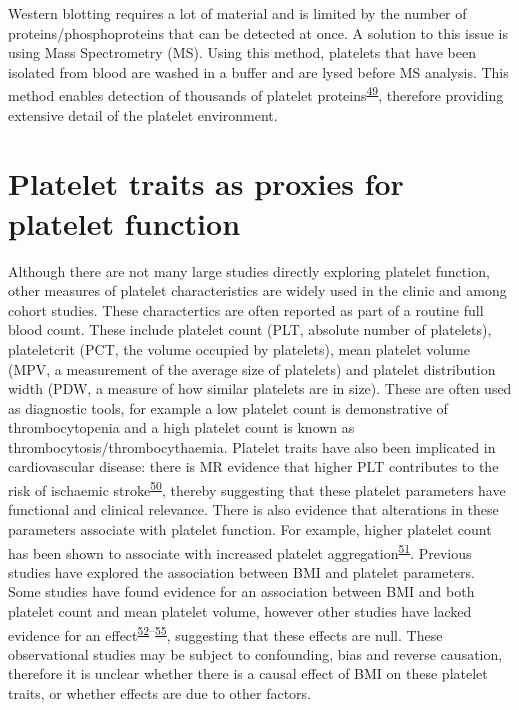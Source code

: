 \documentclass[11pt,twoside]{bristolthesis}
\begin{document}
Western blotting requires a lot of material and is limited by the number of proteins/phosphoproteins that can be detected at once. A solution to this issue is using Mass Spectrometry (MS). Using this method, platelets that have been isolated from blood are washed in a buffer and are lysed before MS analysis. This method enables detection of thousands of platelet proteins\textsuperscript{\protect\hyperlink{ref-Huang2021}{49}}, therefore providing extensive detail of the platelet environment.

\hypertarget{platelet-traits-as-proxies-for-platelet-function}{%
\section{Platelet traits as proxies for platelet function}\label{platelet-traits-as-proxies-for-platelet-function}}

Although there are not many large studies directly exploring platelet function, other measures of platelet characteristics are widely used in the clinic and among cohort studies. These charactertics are often reported as part of a routine full blood count. These include platelet count (PLT, absolute number of platelets), plateletcrit (PCT, the volume occupied by platelets), mean platelet volume (MPV, a measurement of the average size of platelets) and platelet distribution width (PDW, a measure of how similar platelets are in size). These are often used as diagnostic tools, for example a low platelet count is demonstrative of thrombocytopenia and a high platelet count is known as thrombocytosis/thrombocythaemia. Platelet traits have also been implicated in cardiovascular disease: there is MR evidence that higher PLT contributes to the risk of ischaemic stroke\textsuperscript{\protect\hyperlink{ref-Gill2018}{50}}, thereby suggesting that these platelet parameters have functional and clinical relevance. There is also evidence that alterations in these parameters associate with platelet function. For example, higher platelet count has been shown to associate with increased platelet aggregation\textsuperscript{\protect\hyperlink{ref-Wurtz2012}{51}}. Previous studies have explored the association between BMI and platelet parameters. Some studies have found evidence for an association between BMI and both platelet count and mean platelet volume, however other studies have lacked evidence for an effect\textsuperscript{\protect\hyperlink{ref-Furuncuoglu2016}{52}--\protect\hyperlink{ref-Heffron2018}{55}}, suggesting that these effects are null. These observational studies may be subject to confounding, bias and reverse causation, therefore it is unclear whether there is a causal effect of BMI on these platelet traits, or whether effects are due to other factors.
\end{document}
